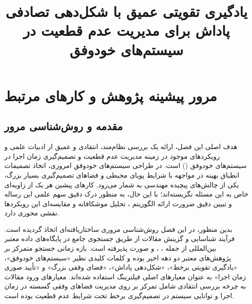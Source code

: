 \documentclass[oneside,openany,phd]{TMU-Thesis}
\title{یادگیری تقویتی عمیق با شکل‌دهی تصادفی پاداش برای مدیریت عدم قطعیت در سیستم‌های خودوفق}
\begin{document}
\AutoPersianDigits
{}

\setcounter{chapter}{2}

\chapter{مرور پیشینه پژوهش و کارهای مرتبط}

\section{مقدمه و روش‌شناسی مرور}
\label{sec:ch3_intro}

هدف اصلی این فصل، ارائه یک بررسی نظام‌مند، انتقادی و عمیق از ادبیات علمی و رویکردهای موجود در زمینه مدیریت عدم قطعیت و تصمیم‌گیری زمان اجرا در سیستم‌های خودوفق () است. در طراحی سیستم‌های خودوفق امروزی، اتخاذ تصمیمات انطباق بهینه در مواجهه با شرایط پویای محیطی و فضاهای تصمیم‌گیری بسیار بزرگ، یکی از چالش‌های پیچیده مهندسی به شمار می‌رود. کارهای پیشین هر یک از زاویه‌ای خاص به این مسئله نگریسته‌اند؛ با این حال، به منظور درک دقیق سهم علمی این رساله و تبیین دقیق ضرورت ارائه الگوریتم ، تحلیل موشکافانه و مقایسه‌ای این رویکردها نقشی محوری دارد.

بدین منظور، در این فصل روش‌شناسی مروری ساختاریافته‌ای اتخاذ گردیده است. فرآیند شناسایی و گزینش مقالات از طریق جستجوی جامع در پایگاه‌های داده معتبر بین‌المللی از جمله ، ،  و  صورت پذیرفته است. بازه زمانی جستجو متمرکز بر پژوهش‌های معتبر دو دهه اخیر بوده و کلمات کلیدی نظیر «سیستم‌های خودوفق»، «یادگیری تقویتی برخط»، «شکل‌دهی پاداش»، «فضای وفقی بزرگ» و «تأیید صوری زمان اجرا» به عنوان معیارهای اصلی فیلترینگ استفاده شده‌اند. معیارهای ورود مقالات به چرخه بررسی انتقادی شامل تمرکز بر روی مدیریت فضاهای وفقی گسسته در زمان اجرا و توانایی سیستم در تصمیم‌گیری برخط تحت شرایط عدم قطعیت بوده است.
\end{document}
